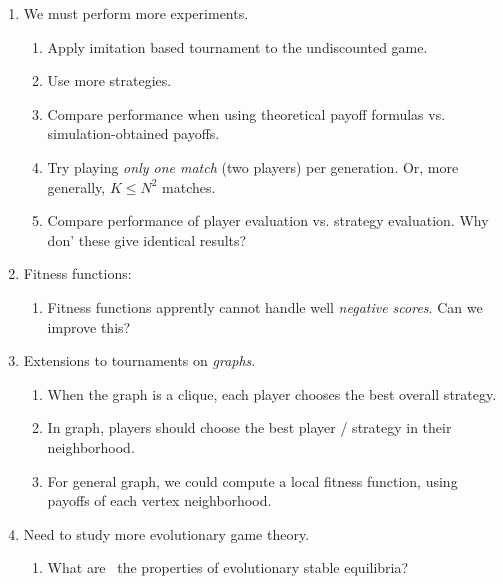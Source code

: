 \documentclass{article}%
\numberwithin{equation}{section}
\begin{document}
\begin{enumerate}
\item We must perform more experiments.

\begin{enumerate}
\item Apply imitation based tournament to the undiscounted game.

\item Use more strategies.

\item Compare performance when using theoretical payoff formulas vs.
simulation-obtained payoffs.

\item Try playing \emph{only one match} (two players) per generation. Or, more
generally, $K\leq N^{2}$ matches.

\item Compare performance of player evaluation vs. strategy evaluation. Why
don' these give identical results?
\end{enumerate}

\item Fitness functions:\ 

\begin{enumerate}
\item Fitness functions apprently cannot handle well \emph{negative scores}.
Can we improve this?
\end{enumerate}

\item Extensions to tournaments on \emph{graphs}.

\begin{enumerate}
\item When the graph is a clique, each player chooses the best overall strategy.

\item In graph, players should choose the best player / strategy in their neighborhood.

\item For general graph, we could compute a local fitness function, using
payoffs of each vertex neighborhood.
\end{enumerate}

\item Need to study more evolutionary game theory.

\begin{enumerate}
\item What are \ the properties of evolutionary stable equilibria?


\end{enumerate}
\end{enumerate}
\end{document}
